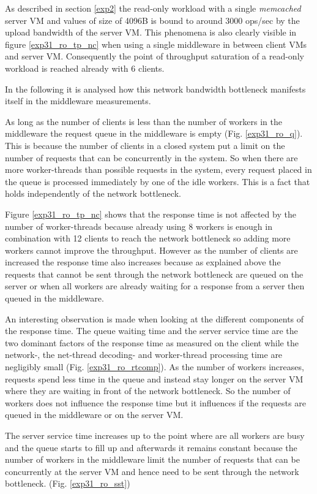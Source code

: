 \documentclass[report.tex]{subfiles}
\begin{document}
As described in section \ref{exp2} the read-only workload with a single \emph{memcached} server VM and values of size of 4096B is bound to around 3000 ops/sec by the upload bandwidth of the server VM. This phenomena is also clearly visible in figure \ref{exp31_ro_tp_nc} when using a single middleware in between client VMs and server VM. Consequently the point of throughput saturation of a read-only workload is reached already with 6 clients. 

In the following it is analysed how this network bandwidth bottleneck manifests itself in the middleware measurements.

As long as the number of clients is less than the number of workers in the middleware the request queue in the middleware is empty (Fig. \ref{exp31_ro_q}). This is because the number of clients in a closed system put a limit on the number of requests that can be concurrently in the system. 
So when there are more worker-threads than possible requests in the system, every request placed in the queue is processed immediately by one of the idle workers. This is a fact that holds independently of the network bottleneck. 

Figure \ref{exp31_ro_tp_nc} shows that the response time is not affected by the number of worker-threads because already using 8 workers is enough in combination with 12 clients to reach the network bottleneck so adding more workers cannot improve the throughput. 
However as the number of clients are increased the response time also increases because as explained above the requests that cannot be sent through the network bottleneck are queued on the server or when all workers are already waiting for a response from a server then queued in the middleware.

An interesting observation is made when looking at the different components of the response time.
The queue waiting time and the server service time are the two dominant factors of the response time as measured on the client while the network-, the net-thread decoding- and worker-thread processing time are negligibly small  (Fig. \ref{exp31_ro_rtcomp}). As the number of workers increases, requests spend less time in the queue and instead stay longer on the server VM where they are waiting in front of the network bottleneck. 
So the number of workers does not influence the response time but it influences if the requests are queued in the middleware or on the server VM.

The server service time increases up to the point where are all workers are busy and the queue starts to fill up and afterwards it remains constant because the number of workers in the middleware limit the number of requests that can be concurrently at the server VM and hence need to be sent through the network bottleneck. (Fig. \ref{exp31_ro_sst})
\end{document}
